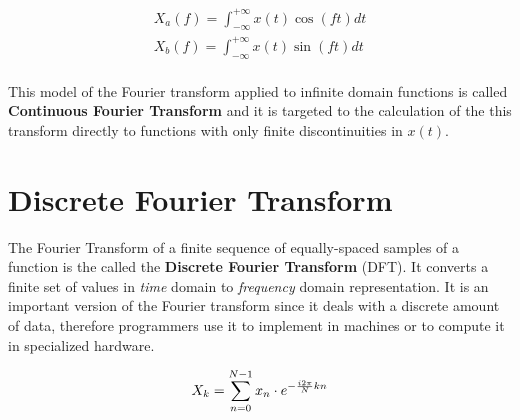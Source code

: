 \documentclass[
  oneside,
  11pt, a4paper,
  footinclude=true,
  headinclude=true,
  cleardoublepage=empty
]{scrbook}
\newcommand{\eqname}[1]{\tag*{#1}}%
\begin{document}
\begin{equation}
    \begin{split}
        X_{a}(f) = \int_{-\infty}^{+\infty} x(t) \cos (f t) dt \\
        X_{b}(f) = \int_{-\infty}^{+\infty} x(t) \sin (f t) dt \\
    \end{split}
\end{equation}




This model of the Fourier transform applied to infinite domain functions is called \textbf{Continuous Fourier Transform} and it is targeted to the calculation of the this transform directly to functions with only finite discontinuities in \( x(t) \).




\section{Discrete Fourier Transform} \label{sec:discrete-fourier-transform}


The Fourier Transform of a finite sequence of equally-spaced samples of a function is the called the \textbf{Discrete Fourier Transform} (DFT). It converts a finite set of values in \textit{time} domain to \textit{frequency} domain representation. It is an important version of the Fourier transform since it deals with a discrete amount of data, therefore programmers use it to implement in machines or to compute it in specialized hardware.

\begin{equation} \label{eq:forward-discrete-fourier-transform}
    X_{k} = \sum_{n=0}^{N-1}x_{n} \cdot e^{- \frac{i 2 \pi}{N}kn} \\ %
\end{equation}
\end{document}
